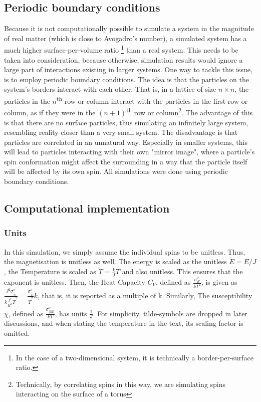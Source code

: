 \documentclass[10pt,a4paper]{article}
\begin{document}
\subsection{Periodic boundary conditions}
Because it is not computationally possible to simulate a system in the magnitude of real matter (which is close to Avogadro's number), a simulated system has a much higher surface-per-volume ratio \footnote{In the case of a two-dimensional system, it is technically a border-per-surface ratio.} than a real system. This needs to be taken into consideration, because otherwise, simulation results would ignore a large part of interactions existing in larger systems. One way to tackle this issue, is to employ periodic boundary conditions. The idea is that the particles on the system's borders interact with each other. That is, in a lattice of size $n\times n$, the particles in the $n$\textsuperscript{th} row or column interact with the particles in the first row or column, as if they were in the  $(n+1)$\textsuperscript{th} row or column\footnote{Technically, by correlating spins in this way, we are simulating spins interacting on the surface of a torus}. The advantage of this is that there are no surface particles, thus simulating an infinitely large system, resembling reality closer than a very small system. The disadvantage is that particles are correlated in an unnatural way. Especially in smaller systems, this will lead to particles interacting with their own "mirror image", where a particle's spin conformation might affect the surrounding in a way that the particle itself will be affected by its own spin.
All simulations were done using periodic boundary conditions.
\subsection{Computational implementation}

\subsubsection{Units}
In this simulation, we simply assume the individual spins to be unitless. Thus, the magnetisation is unitless as well.
The energy is scaled as the unitless $\tilde{E}=E/J$, the Temperature is scaled as  $\tilde{T}=\frac{k}{J}T$ and also unitless. This ensures that the exponent is unitless.
Then, the Heat Capacity $C_V$, defined as $\frac{\sigma_E^2}{kT^2}$, is given as $\frac{J^2\sigma^2_{\tilde{E}}}{k\frac{J^2}{K^2} \tilde{T}^2}=\frac{\sigma^2_{\tilde{E}}}{\tilde{T}^2}k$, that is, it is reported as a multiple of k. 
Similarly, The susceptibility $\chi$, defined as $\frac{\sigma_{|M|}^2}{kT}$, has units $\frac{1}{J}$. For simplicity, tilde-symbols are dropped in later discussions, and when stating the temperature in the text, its scaling factor is omitted.
\end{document}
